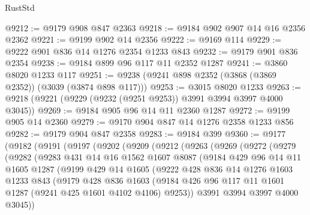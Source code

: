 \begin{lexlean}{RustStd}
\begin{coremodule}
@9212 := @9179 @908 @847 @2363
@9218 := @9184 @902 @907 @14 @16 @2356 @2362
@9221 := @9199 @902 @14 @2356
@9222 := @9169 @114
@9229 := @9222 @901 @836 @14 @1276 @2354 @1233 @843
@9232 := @9179 @901 @836 @2354
@9238 := @9184 @899 @96 @117 @11 @2352 @1287
@9241 := @3860 @8020 @1233 @117
@9251 := @9238 (@9241 @898 @2352 (@3868 (@3869 @2352)) (@3039 (@3874 @898 @117)))
@9253 := @3015 @8020 @1233
@9263 := @9218 (@9221 (@9229 (@9232 (@9251 @9253)) @3991 @3994 @3997 @4000 @3045))
@9269 := @9184 @905 @96 @14 @11 @2360 @1287
@9272 := @9199 @905 @14 @2360
@9279 := @9170 @904 @847 @14 @1276 @2358 @1233 @856
@9282 := @9179 @904 @847 @2358
@9283 := @9184 @399
@9360 := @9177
    (@9182
      (@9191
        (@9197
          (@9202
            (@9209
              (@9212
                (@9263
                  (@9269
                    (@9272
                      (@9279
                        (@9282
                          (@9283
                            @431
                            @14
                            @16
                            @1562
                            @1607
                            @8087
                            (@9184
                              @429
                              @96
                              @14
                              @11
                              @1605
                              @1287
                              (@9199
                                @429
                                @14
                                @1605
                                (@9222
                                  @428
                                  @836
                                  @14
                                  @1276
                                  @1603
                                  @1233
                                  @843
                                  (@9179
                                    @428
                                    @836
                                    @1603
                                    (@9184
                                      @426
                                      @96
                                      @117
                                      @11
                                      @1601
                                      @1287
                                      (@9241 @425 @1601 @4102 @4106)
                                      @9253))
                                  @3991
                                  @3994
                                  @3997
                                  @4000
                                  @3045))

\end{coremodule}
\end{lexlean}

